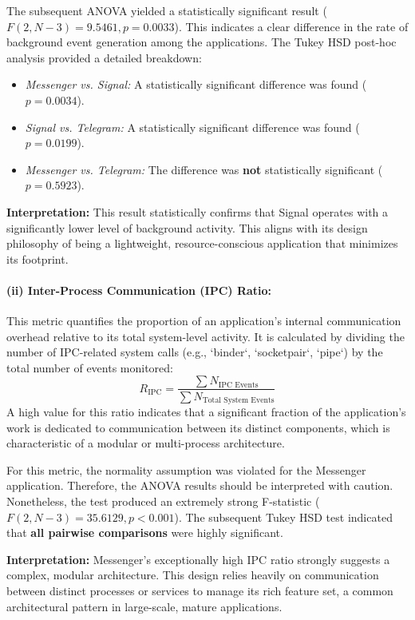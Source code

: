 \documentclass[a4paper,12pt]{report}
\begin{document}
The subsequent ANOVA yielded a statistically significant result ($F(2, N-3) = 9.5461, p = 0.0033$). This indicates a clear difference in the rate of background event generation among the applications. The Tukey HSD post-hoc analysis provided a detailed breakdown:
\begin{itemize}
    \item \textit{Messenger vs. Signal:} A statistically significant difference was found ($p=0.0034$).
    \item \textit{Signal vs. Telegram:} A statistically significant difference was found ($p=0.0199$).
    \item \textit{Messenger vs. Telegram:} The difference was \textbf{not} statistically significant ($p=0.5923$).
\end{itemize}


\textbf{Interpretation:} This result statistically confirms that Signal operates with a significantly lower level of background activity. This aligns with its design philosophy of being a lightweight, resource-conscious application that minimizes its footprint.

\paragraph{(ii) Inter-Process Communication (IPC) Ratio:}
This metric quantifies the proportion of an application's internal communication overhead relative to its total system-level activity. It is calculated by dividing the number of IPC-related system calls (e.g., `binder`, `socketpair`, `pipe`) by the total number of events monitored:
$$R_{\text{IPC}} = \frac{\sum N_{\text{IPC Events}}}{\sum N_{\text{Total System Events}}}$$
A high value for this ratio indicates that a significant fraction of the application's work is dedicated to communication between its distinct components, which is characteristic of a modular or multi-process architecture.

For this metric, the normality assumption was violated for the Messenger application. Therefore, the ANOVA results should be interpreted with caution. Nonetheless, the test produced an extremely strong F-statistic ($F(2, N-3) = 35.6129, p < 0.001$). The subsequent Tukey HSD test indicated that \textbf{all pairwise comparisons} were highly significant.

\textbf{Interpretation:} Messenger's exceptionally high IPC ratio strongly suggests a complex, modular architecture. This design relies heavily on communication between distinct processes or services to manage its rich feature set, a common architectural pattern in large-scale, mature applications.
\end{document}
